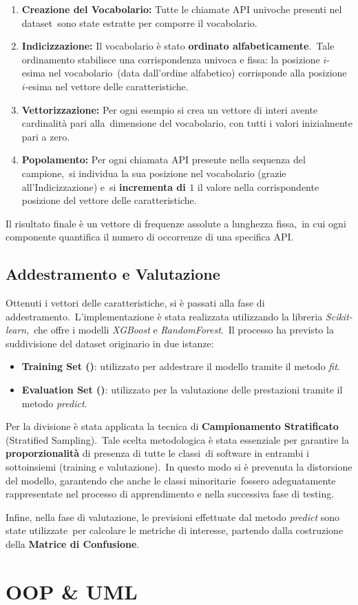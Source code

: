 \begin{enumerate}
    \item \textbf{Creazione del Vocabolario:} Tutte le chiamate API univoche presenti nel dataset\
          sono state estratte per comporre il vocabolario.
    \item \textbf{Indicizzazione:} Il vocabolario è stato \textbf{ordinato alfabeticamente}.\
          Tale ordinamento stabilisce una corrispondenza univoca e fissa: la posizione $i$-esima nel vocabolario\
          (data dall'ordine alfabetico) corrisponde alla posizione $i$-esima nel vettore delle caratteristiche.
    \item \textbf{Vettorizzazione:} Per ogni esempio si crea un vettore di interi avente cardinalità pari alla\
          dimensione del vocabolario, con tutti i valori inizialmente pari a zero.
    \item \textbf{Popolamento:} Per ogni chiamata API presente nella sequenza del campione,\
          si individua la sua posizione nel vocabolario (grazie all'Indicizzazione) e\
          si \textbf{incrementa di $1$} il valore nella corrispondente posizione del vettore delle caratteristiche.
\end{enumerate}

Il risultato finale è un vettore di frequenze assolute a lunghezza fissa,\
in cui ogni componente quantifica il numero di occorrenze di una specifica API.

\subsection{Addestramento e Valutazione}

Ottenuti i vettori delle caratteristiche, si è passati alla fase di addestramento.\
L'implementazione è stata realizzata utilizzando la libreria \textit{Scikit-learn},\
che offre i modelli \textit{XGBoost} e \textit{RandomForest}.\
Il processo ha previsto la suddivisione del dataset originario in due istanze:
\begin{itemize}
    \item \textbf{Training Set (\percc{80})}: utilizzato per addestrare il modello tramite il metodo \textit{fit}.
    \item \textbf{Evaluation Set (\percc{20})}: utilizzato per la valutazione delle prestazioni tramite il metodo \textit{predict}.
\end{itemize}

Per la divisione è stata applicata la tecnica di \textbf{Campionamento Stratificato} (Stratified Sampling).\
Tale scelta metodologica è stata essenziale per garantire la \textbf{proporzionalità} di presenza di tutte le classi\
di software in entrambi i sottoinsiemi (training e valutazione).\
In questo modo si è prevenuta la distorsione del modello, garantendo che anche le classi minoritarie\
fossero adeguatamente rappresentate nel processo di apprendimento e nella successiva fase di testing.

Infine, nella fase di valutazione, le previsioni effettuate dal metodo \textit{predict} sono state utilizzate\
per calcolare le metriche di interesse, partendo dalla costruzione della \textbf{Matrice di Confusione}.

\section{OOP \& UML}
